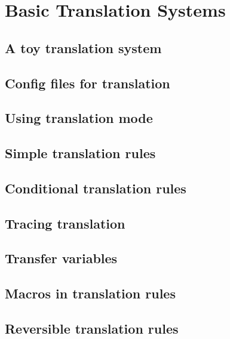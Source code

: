 \chapter{Basic Translation Systems}
\label{Chapter:BasicTranslation}

\author{Manny Rayner}

\section{A toy translation system}
\label{Section:ToyTranslationOverview}

\section{Config files for translation}
\label{Section:TranslationConfig}

\section{Using translation mode}
\label{Section:TranslationMode}

\section{Simple translation rules}
\label{Section:TranslationRules}

\section{Conditional translation rules}
\label{Section:ConditionalTranslationRules}

\section{Tracing translation}
\label{Section:TranslationTrace}

\section{Transfer variables}
\label{Section:TransferVariables}

\section{Macros in translation rules}
\label{Section:TranslationRuleMacros}

\section{Reversible translation rules}
\label{Section:ReversibleTranslationRule}

